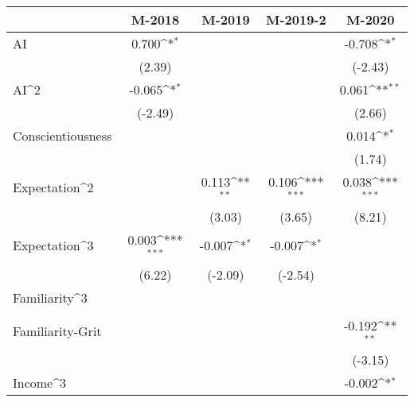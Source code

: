 {
\def\sym#1{\ifmmode^{#1}\else\(^{#1}\)\fi}
\begin{tabular}{l*{4}{c}}
\toprule
                         &      M-2018         &      M-2019         &    M-2019-2         &      M-2020         \\
\midrule
AI                       &       0.700\sym{*}  &                     &                     &      -0.708\sym{*}  \\
                         &      (2.39)         &                     &                     &     (-2.43)         \\
\addlinespace
AI^2                     &      -0.065\sym{*}  &                     &                     &       0.061\sym{**} \\
                         &     (-2.49)         &                     &                     &      (2.66)         \\
\addlinespace
Conscientiousness        &                     &                     &                     &       0.014\sym{*}  \\
                         &                     &                     &                     &      (1.74)         \\
\addlinespace
Expectation^2            &                     &       0.113\sym{**} &       0.106\sym{***}&       0.038\sym{***}\\
                         &                     &      (3.03)         &      (3.65)         &      (8.21)         \\
\addlinespace
Expectation^3            &       0.003\sym{***}&      -0.007\sym{*}  &      -0.007\sym{*}  &                     \\
                         &      (6.22)         &     (-2.09)         &     (-2.54)         &                     \\
\addlinespace
Familiarity^3            &                     &                     &                     &                     \\
                         &                     &                     &                     &                     \\
\addlinespace
Familiarity-Grit         &                     &                     &                     &      -0.192\sym{**} \\
                         &                     &                     &                     &     (-3.15)         \\
\addlinespace
Income^3                 &                     &                     &                     &      -0.002\sym{*}  \\

\end{tabular}}
